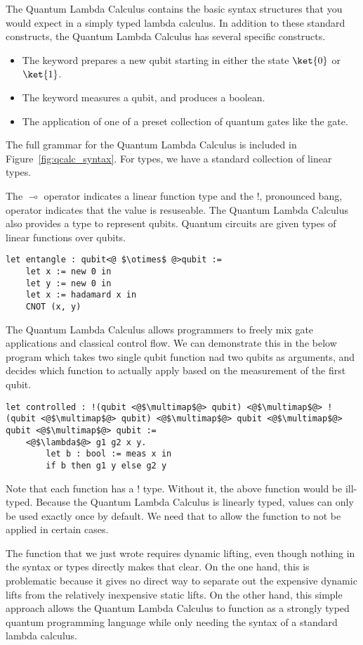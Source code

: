The Quantum Lambda Calculus contains the basic syntax structures that you would expect in a simply typed lambda calculus.
In addition to these standard constructs, the Quantum Lambda Calculus has several specific constructs.
\begin{itemize}
\item The  keyword prepares a new qubit starting in either the state $\ket{0}$ or $\ket{1}$.
\item The  keyword measures a qubit, and produces a boolean.
\item The application of one of a preset collection of quantum gates like the  gate.
\end{itemize}
The full grammar for the Quantum Lambda Calculus is included in Figure~\ref{fig:qcalc_syntax}.
For types, we have a standard collection of linear types.


The $\multimap$ operator indicates a linear function type and the $!$, pronounced bang, operator indicates that the value is resuseable.
The Quantum Lambda Calculus also provides a  type to represent qubits.
Quantum circuits are given types of linear functions over qubits.

\begin{lstlisting}[style=customcoq]
let entangle : qubit<@ $\otimes$ @>qubit :=
    let x := new 0 in
    let y := new 0 in
    let x := hadamard x in
    CNOT (x, y)
\end{lstlisting}

The Quantum Lambda Calculus allows programmers to freely mix gate applications and classical control flow.
We can demonstrate this in the below program which takes two single qubit function nad two qubits as arguments, and decides which function to actually apply based on the measurement of the first qubit.
\begin{lstlisting}[style=customcoq]
let controlled : !(qubit <@$\multimap$@> qubit) <@$\multimap$@> !(qubit <@$\multimap$@> qubit) <@$\multimap$@> qubit <@$\multimap$@> qubit <@$\multimap$@> qubit :=
    <@$\lambda$@> g1 g2 x y.
        let b : bool := meas x in
        if b then g1 y else g2 y
\end{lstlisting}
Note that each function has a $!$ type.
Without it, the above function would be ill-typed.
Because the Quantum Lambda Calculus is linearly typed, values can only be used exactly once by default.
We need that to allow the function to not be applied in certain cases.

The function that we just wrote requires dynamic lifting, even though nothing in the syntax or types directly makes that clear.
On the one hand, this is problematic because it gives no direct way to separate out the expensive dynamic lifts from the relatively inexpensive static lifts.
On the other hand, this simple approach allows the Quantum Lambda Calculus to function as a strongly typed quantum programming language while only needing the syntax of a standard lambda calculus.


